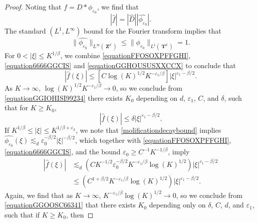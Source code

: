 \documentclass[12pt,reqno]{article}
\numberwithin{equation}{section}
\DeclareMathOperator{\ZZ}{\mathbf{Z}}
\DeclareMathOperator{\TT}{\mathbf{T}}
\begin{document}
\begin{proof}
    Noting that $f = D * \phi_{\varepsilon_0}$, we find that
    \begin{equation} \label{equation6666GGCIS}
        |\widehat{f}| = |\widehat{D}| |\widehat{\phi_{\varepsilon_0}}|.
    \end{equation}
    The standard $(L^1,L^\infty)$ bound for the Fourier transform implies that
    \begin{equation} \label{equationGGHOUSUSXXCCX}
        \| \widehat{\phi_{\varepsilon_0}} \|_{L^\infty(\ZZ^d)} \leq \| \phi_{\varepsilon_0} \|_{L^1(\TT^d)} = 1.
    \end{equation}
    For $0 < |\xi| \leq K^{1/\beta}$, we combine \eqref{equationFFOSOXPFFGHI}, \eqref{equation6666GGCIS} and \eqref{equationGGHOUSUSXXCCX} to conclude that
    \begin{equation} \label{equationGGIOHISI99234}
        |\widehat{f}(\xi)| \leq \left[ C \log(K)^{1/2} K^{-\varepsilon_1/\beta} \right] |\xi|^{\varepsilon_1 - \beta/2}.
    \end{equation}
    As $K \to \infty$, $\log(K)^{1/2} K^{-\varepsilon_1/\beta} \to 0$, so we conclude from \eqref{equationGGIOHISI99234} there exists $K_0$ depending on $d$, $\varepsilon_1$, $C$, and $\delta$, such that for $K \geq K_0$,
    \begin{equation} \label{equation663sdDDDCC}
        |\widehat{f}(\xi)| \leq \delta |\xi|^{\varepsilon_1-\beta/2}.
    \end{equation}
    If $K^{1/\beta} \leq |\xi| \leq K^{1/\beta + \varepsilon_2}$, we note that \eqref{molificationdecaybound} implies $\widehat{\phi_{\varepsilon_0}}(\xi) \lesssim_d \varepsilon_0^{-\beta/2} |\xi|^{-\beta/2}$, which together with \eqref{equationFFOSOXPFFGHI}, \eqref{equation6666GGCIS}, and the bound $\varepsilon_0 \geq C^{-1} K^{-1/\beta}$, imply
    \begin{equation} \label{equationGGOOSC66341}
    \begin{split}
        |\widehat{f}(\xi)| &\lesssim_d \left( C K^{-1/2} \varepsilon_0^{-\beta/2} K^{-\varepsilon_1/\beta} \log(K)^{1/2} \right) |\xi|^{\varepsilon_1-\beta/2}\\
        &\leq \left( C^{1 + \beta/2} K^{-\varepsilon_1/\beta} \log(K)^{1/2} \right) |\xi|^{\varepsilon_1 - \beta/2}.
    \end{split}
    \end{equation}
    Again, we find that as $K \to \infty$, $K^{-\varepsilon_1/\beta} \log(K)^{1/2} \to 0$, so we conclude from \eqref{equationGGOOSC66341} that there exists $K_0$ depending only on $\delta$, $C$, $d$, and $\varepsilon_1$, such that if $K \geq K_0$, then

\end{proof}
\end{document}
